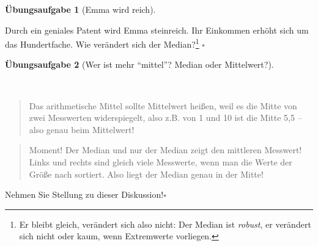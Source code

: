 \documentclass[
  letterpaper,
]{scrbook}
\theoremstyle{definition}
\newtheorem{exercise}{Übungsaufgabe}[chapter]
\theoremstyle{definition}
\theoremstyle{definition}
\theoremstyle{remark}
\begin{document}
\begin{exercise}[Emma wird
reich]\protect\hypertarget{exr-md2}{}\label{exr-md2}

Durch ein geniales Patent wird Emma steinreich. Ihr Einkommen erhöht
sich um das Hundertfache. Wie verändert sich der Median?\footnote{Er
  bleibt gleich, verändert sich also nicht: Der Median ist
  \emph{robust}, er verändert sich nicht oder kaum, wenn Extremwerte
  vorliegen.} \(\square\)

\end{exercise}

\begin{exercise}[Wer ist mehr \enquote{mittel}? Median oder
Mittelwert?]\protect\hypertarget{exr-mw-md}{}\label{exr-mw-md}

~

\begin{quote}
{} Das arithmetische Mittel sollte Mittelwert heißen,
weil es die Mitte von zwei Messwerten widerspiegelt, also z.B. von 1 und
10 ist die Mitte 5,5 -- also genau beim Mittelwert!
\end{quote}

\begin{quote}
{} Moment! Der Median und nur der Median zeigt den
mittleren Messwert! Links und rechts sind gleich viele Messwerte, wenn
man die Werte der Größe nach sortiert. Also liegt der Median genau in
der Mitte!
\end{quote}

Nehmen Sie Stellung zu dieser Diskussion!\(\square\)

\end{exercise}
\end{document}

